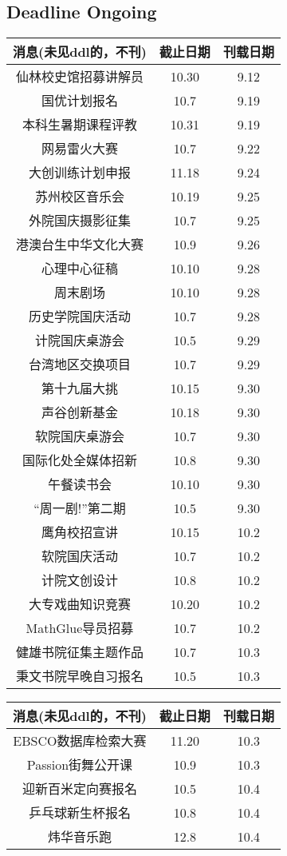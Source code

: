\documentclass[letterpaper, 12pt]{article}
\begin{document}
\begin{multicols}{2}

\section{Deadline Ongoing}
\begin{tabular}{|c|c|c|}
    \hline
    消息(未见ddl的，不刊) & 截止日期 & 刊载日期\\
    \hline\hline
    仙林校史馆招募讲解员 & 10.30 & 9.12\\
    国优计划报名 & 10.7 & 9.19\\
    本科生暑期课程评教 & 10.31 & 9.19\\
    网易雷火大赛 & 10.7 & 9.22\\
    大创训练计划申报 & 11.18 & 9.24\\
    苏州校区音乐会 & 10.19 & 9.25\\
    外院国庆摄影征集 & 10.7 & 9.25\\
    港澳台生中华文化大赛 & 10.9 & 9.26\\
    心理中心征稿 & 10.10 & 9.28\\
    周末剧场 & 10.10 & 9.28\\
    历史学院国庆活动 & 10.7 & 9.28\\
    计院国庆桌游会 & 10.5 & 9.29\\
    台湾地区交换项目 & 10.7 & 9.29\\
    第十九届大挑 & 10.15 & 9.30\\
    声谷创新基金 & 10.18 & 9.30\\
    软院国庆桌游会 & 10.7 & 9.30\\
    国际化处全媒体招新 & 10.8 & 9.30\\
    午餐读书会 & 10.10 & 9.30\\
    “周一剧!”第二期 & 10.5 & 9.30\\
    鹰角校招宣讲 & 10.15 & 10.2\\
    软院国庆活动 & 10.7 & 10.2\\
    计院文创设计 & 10.8 & 10.2\\
    大专戏曲知识竞赛 & 10.20 & 10.2\\
    MathGlue导员招募 & 10.7 & 10.2\\
    健雄书院征集主题作品 & 10.7 & 10.3\\
    秉文书院早晚自习报名 & 10.5 & 10.3\\
    \hline
\end{tabular}
\begin{tabular}{|c|c|c|}
    \hline
    消息(未见ddl的，不刊) & 截止日期 & 刊载日期\\
    \hline\hline
    EBSCO数据库检索大赛 & 11.20 & 10.3\\
    Passion街舞公开课 & 10.9 & 10.3\\
    迎新百米定向赛报名 & 10.5 & 10.4\\
    乒乓球新生杯报名 & 10.8 & 10.4\\
    炜华音乐跑 & 12.8 & 10.4\\
    \hline
\end{tabular}

\end{multicols}
\end{document}
